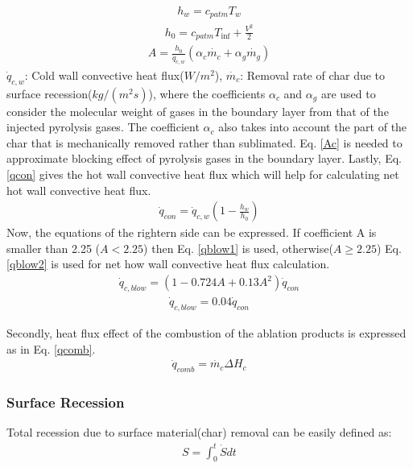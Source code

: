 \documentclass[a4paper, 12pt]{article} %
\begin{document}
 \begin{eqnarray} \label{hw}
h_w=c_{patm}T_w
\end{eqnarray}
\begin{eqnarray} \label{h0}
h_0=c_{patm}T_{\inf}+\frac{V^2}{2}
\end{eqnarray}
\begin{eqnarray} \label{Ac}
A=\frac{h_0}{\dot{q}_{c,w}}(\alpha _c \dot{m_c} +\alpha _g \dot{m_g})
\end{eqnarray}
$\dot{q}_{c,w}$: Cold wall convective heat flux($W/m^2$), $\dot{m_c}$: Removal rate of char due to surface recession($kg/(m^2s)$), where the coefficients $\alpha_c$ and $\alpha_g$ are
used to consider the molecular weight of gases in the boundary layer from that of the injected pyrolysis gases. The coefficient $\alpha_c$ also takes into account the part of the char that is mechanically removed rather than sublimated. Eq. \ref{Ac} is needed to approximate blocking effect of pyrolysis gases in the boundary layer. Lastly, Eq. \ref{qcon} gives the hot wall convective heat flux which will help for calculating net hot wall convective heat flux.
\begin{eqnarray} \label{qcon}
\dot{q}_{con}=\dot{q}_{c,w}(1-\frac{h_w}{h_0})
\end{eqnarray}
\newline
Now, the equations of the rightern side can be expressed. If coefficient A is smaller than 2.25 ($A<2.25$) then Eq. \ref{qblow1} is used, otherwise($A\geq2.25$) Eq. \ref{qblow2} is used for net how wall convective heat flux calculation.
\begin{eqnarray} \label{qblow1}
\dot{q}_{c,blow}=(1-0.724A+0.13A^2)\dot{q}_{con}
\end{eqnarray}
\begin{eqnarray} \label{qblow2}
\dot{q}_{c,blow}=0.04\dot{q}_{con}
\end{eqnarray}
\par
Secondly, heat flux effect of the combustion of the ablation products is expressed as in Eq. \ref{qcomb}.
\begin{eqnarray} \label{qcomb}
\dot{q}_{comb}=\dot{m_c}\Delta H_c
\end{eqnarray}

\subsubsection{Surface Recession }
Total recession due to surface material(char) removal can be easily defined as: 
\begin{eqnarray} \label{qcomb}
S=\int_{0}^{t} \dot{S}dt
\end{eqnarray}
\end{document}
